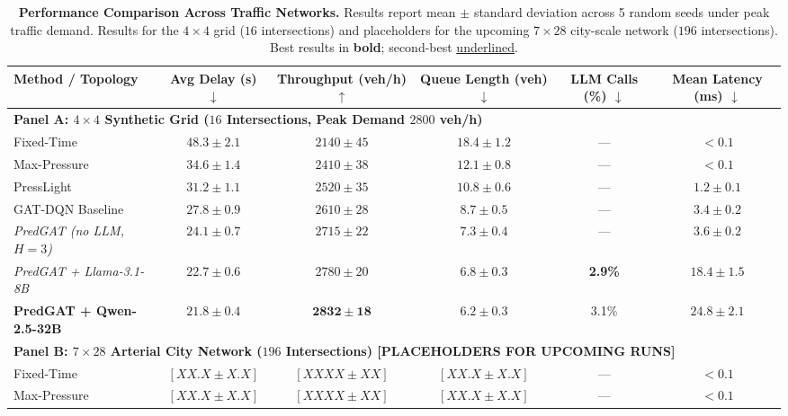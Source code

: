 \documentclass[11pt,a4paper,twocolumn]{article}
\begin{document}
\begin{table}[t]
\centering
\small
\caption{\textbf{Performance Comparison Across Traffic Networks.} Results report mean $\pm$ standard deviation across 5 random seeds under peak traffic demand. Results for the $4\times4$ grid ($16$ intersections) and placeholders for the upcoming $7\times28$ city-scale network ($196$ intersections). Best results in \textbf{bold}; second-best \underline{underlined}.}
\label{tab:main_results}
\begin{tabular}{lccccc}
\toprule
\textbf{Method / Topology} & \textbf{Avg Delay (s)} $\downarrow$ & \textbf{Throughput (veh/h)} $\uparrow$ & \textbf{Queue Length (veh)} $\downarrow$ & \textbf{LLM Calls (\%)} $\downarrow$ & \textbf{Mean Latency (ms)} $\downarrow$ \\
\midrule
\multicolumn{6}{l}{\textbf{Panel A: $4\times4$ Synthetic Grid ($16$ Intersections, Peak Demand $2800$ veh/h)}} \\
\midrule
Fixed-Time & $48.3 \pm 2.1$ & $2140 \pm 45$ & $18.4 \pm 1.2$ & --- & $< 0.1$ \\
Max-Pressure~\cite{varaiya2013max} & $34.6 \pm 1.4$ & $2410 \pm 38$ & $12.1 \pm 0.8$ & --- & $< 0.1$ \\
PressLight~\cite{wei2019presslight} & $31.2 \pm 1.1$ & $2520 \pm 35$ & $10.8 \pm 0.6$ & --- & $1.2 \pm 0.1$ \\
GAT-DQN Baseline & $27.8 \pm 0.9$ & $2610 \pm 28$ & $8.7 \pm 0.5$ & --- & $3.4 \pm 0.2$ \\
\midrule
\textit{PredGAT (no LLM, $H=3$)} & $24.1 \pm 0.7$ & $2715 \pm 22$ & $7.3 \pm 0.4$ & --- & $3.6 \pm 0.2$ \\
\textit{PredGAT + Llama-3.1-8B} & \underline{$22.7 \pm 0.6$} & \underline{$2780 \pm 20$} & \underline{$6.8 \pm 0.3$} & \textbf{2.9\%} & $18.4 \pm 1.5$ \\
\textbf{PredGAT + Qwen-2.5-32B} & $\mathbf{21.8 \pm 0.4}$ & $\mathbf{2832 \pm 18}$ & $\mathbf{6.2 \pm 0.3}$ & 3.1\% & $24.8 \pm 2.1$ \\
\midrule
\multicolumn{6}{l}{\textbf{Panel B: $7\times28$ Arterial City Network ($196$ Intersections) [PLACEHOLDERS FOR UPCOMING RUNS]}} \\
\midrule
Fixed-Time & $[XX.X \pm X.X]$ & $[XXXX \pm XX]$ & $[XX.X \pm X.X]$ & --- & $< 0.1$ \\
Max-Pressure~\cite{varaiya2013max} & $[XX.X \pm X.X]$ & $[XXXX \pm XX]$ & $[XX.X \pm X.X]$ & --- & $< 0.1$ \\

\end{tabular}
\end{table}
\end{document}
